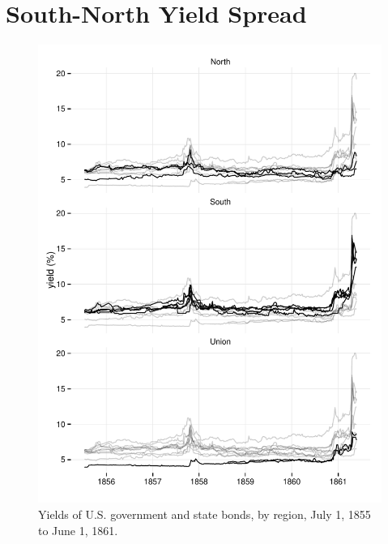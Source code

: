 \documentclass[11pt, oneside, article]{memoir}\usepackage[]{graphicx}\usepackage[]{color}
\begin{document}
\section{South-North Yield Spread}
\label{sec:south-north-yield}


\begin{figure}
  \centerfloat
  \includegraphics{figures/fig_yields_regions-1}
\caption{Yields of U.S. government and state bonds, by region, July  1, 1855 to June  1, 1861.}
\label{fig:yields_regions}
\end{figure}
\end{document}
